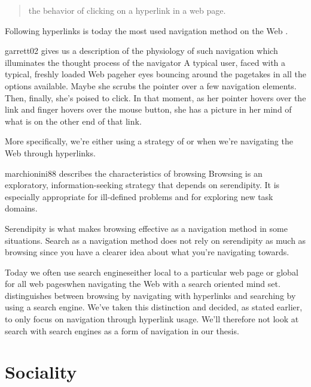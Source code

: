 \begin{quote}
  the behavior of clicking on a hyperlink in a web page.
\end{quote}

Following hyperlinks is
today the most used navigation method on the Web \citep[]{weinreich08}.
\begin{fullquote}{garrett02}{%
  gives us a description of the physiology of such navigation which
  illuminates the thought process of the navigator}
    A typical user, faced with a typical, freshly loaded Web page\dash{}her
    eyes bouncing around the page\dash{}takes in all the options available.
    Maybe she scrubs the pointer over a few navigation elements. Then,
    finally, she's poised to click. In that moment, as her pointer hovers over
    the link and finger hovers over the mouse button, she has a picture in her
    mind of what is on the other end of that link.
\end{fullquote}

More specifically, we're either using a strategy of  or
 when we're navigating the Web through hyperlinks.
\begin{fullquote}[\p{71}]{marchionini88}{%
  describes the characteristics of browsing}
    Browsing is an exploratory, information-seeking
    strategy that depends on serendipity. It is
    especially appropriate for ill-defined problems
    and for exploring new task domains.
\end{fullquote}
Serendipity\dash{}%
\dash{}is what makes browsing effective as a navigation method in some
situations.
Search as a navigation method does not rely on serendipity as much as browsing
since you have a clearer idea about what you're navigating towards.

Today we often use search engines\dash{}either local to a particular web page
or global for all web pages\dash{}when
navigating the Web with a search oriented mind set.
\citet[]{freyne07} distinguishes between browsing by navigating
with hyperlinks and searching by using a search engine. We've taken this
distinction and decided, as stated earlier, to only focus on navigation
through hyperlink usage. We'll therefore not look at search with search engines
as a form of navigation in our thesis.

\section{Sociality}

